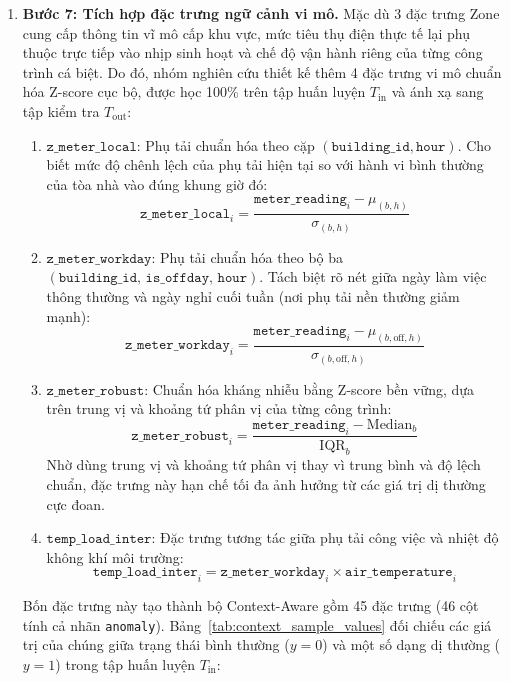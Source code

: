 \begin{enumerate}
    \item \textbf{Bước 7: Tích hợp đặc trưng ngữ cảnh vi mô.}
    Mặc dù 3 đặc trưng Zone cung cấp thông tin vĩ mô cấp khu vực, mức tiêu thụ điện thực tế lại phụ thuộc trực tiếp vào nhịp sinh hoạt và chế độ vận hành riêng của từng công trình cá biệt. Do đó, nhóm nghiên cứu thiết kế thêm 4 đặc trưng vi mô chuẩn hóa Z-score cục bộ, được học 100\% trên tập huấn luyện $T_{\text{in}}$ và ánh xạ sang tập kiểm tra $T_{\text{out}}$:
    \begin{enumerate}
        \item $\texttt{z\_meter\_local}$: Phụ tải chuẩn hóa theo cặp $(\texttt{building\_id}, \texttt{hour})$. Cho biết mức độ chênh lệch của phụ tải hiện tại so với hành vi bình thường của tòa nhà vào đúng khung giờ đó:
        \begin{equation*}
            \texttt{z\_meter\_local}_i = \frac{\texttt{meter\_reading}_i - \mu_{(b, h)}}{\sigma_{(b, h)}}
        \end{equation*}
        \item $\texttt{z\_meter\_workday}$: Phụ tải chuẩn hóa theo bộ ba $(\texttt{building\_id},\allowbreak\, \texttt{is\_offday},\allowbreak\, \texttt{hour})$. Tách biệt rõ nét giữa ngày làm việc thông thường và ngày nghỉ cuối tuần (nơi phụ tải nền thường giảm mạnh):
        \begin{equation*}
            \texttt{z\_meter\_workday}_i = \frac{\texttt{meter\_reading}_i - \mu_{(b, \text{off}, h)}}{\sigma_{(b, \text{off}, h)}}
        \end{equation*}
        \item $\texttt{z\_meter\_robust}$: Chuẩn hóa kháng nhiễu bằng Z-score bền vững, dựa trên trung vị và khoảng tứ phân vị của từng công trình:
        \begin{equation*}
            \texttt{z\_meter\_robust}_i = \frac{\texttt{meter\_reading}_i - \text{Median}_b}{\text{IQR}_b}
        \end{equation*}
        Nhờ dùng trung vị và khoảng tứ phân vị thay vì trung bình và độ lệch chuẩn, đặc trưng này hạn chế tối đa ảnh hưởng từ các giá trị dị thường cực đoan.
        \item $\texttt{temp\_load\_inter}$: Đặc trưng tương tác giữa phụ tải công việc và nhiệt độ không khí môi trường:
        \begin{equation*}
            \texttt{temp\_load\_inter}_i = \texttt{z\_meter\_workday}_i \times \texttt{air\_temperature}_i
        \end{equation*}
    \end{enumerate}
    Bốn đặc trưng này tạo thành bộ Context-Aware gồm 45 đặc trưng (46 cột tính cả nhãn \texttt{anomaly}). Bảng~\ref{tab:context_sample_values} đối chiếu các giá trị của chúng giữa trạng thái bình thường ($y=0$) và một số dạng dị thường ($y=1$) trong tập huấn luyện $T_{\text{in}}$:


\end{enumerate}
